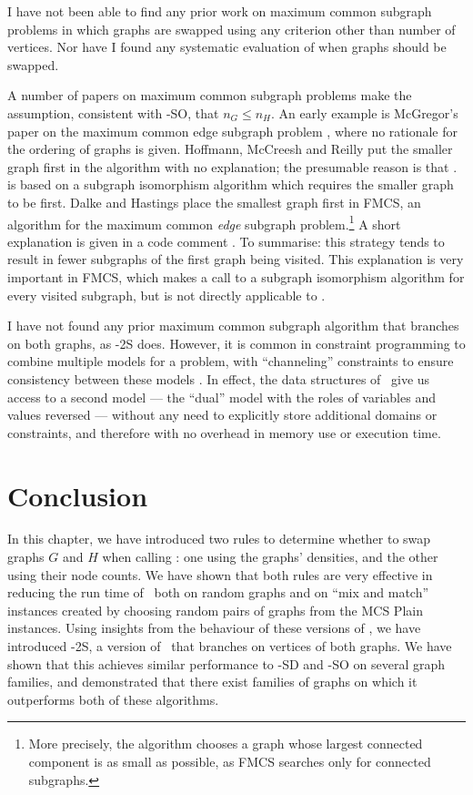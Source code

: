 I have not been able to find any prior work on maximum common subgraph problems in which
graphs are swapped using any criterion other than number of vertices.  Nor have I found
any systematic evaluation of when graphs should be swapped.

A number of papers on maximum common subgraph problems make the assumption, consistent
with \McSplit-SO, that $n_G \leq n_H$.  An early example
is McGregor's paper on the maximum common edge subgraph problem \cite{DBLP:journals/spe/McGregor82},
where no rationale for the ordering of graphs is given.
Hoffmann, McCreesh and Reilly \cite{UpcomingAAAIPaper} put the smaller graph first
in the \kDown algorithm with no explanation; the presumable reason is that \kDown.
is based on a subgraph isomorphism algorithm which requires the smaller graph to be first.
Dalke and Hastings \cite{DBLP:journals/jcheminf/DalkeH13} place the smallest
graph first in FMCS, an algorithm for the maximum
common \emph{edge} subgraph problem.\footnote{More precisely, the algorithm chooses a graph whose largest
connected component is as small as possible, as FMCS searches only for connected subgraphs.}
A short explanation is given in a code comment \cite{DalkeFmcsSource}. To summarise: this strategy tends to
result in fewer subgraphs of the first graph being visited.  This explanation is very
important in FMCS, which makes a call to a subgraph isomorphism algorithm for every visited
subgraph, but is not directly applicable to \McSplit.

I have not found any prior maximum common subgraph algorithm that branches on both graphs,
as \McSplit-2S does.  However, it is common in constraint programming to combine multiple models
for a problem, with ``channeling'' constraints to ensure consistency between these models
\cite{DBLP:journals/constraints/ChengCLW99}.  In effect, the data structures of \McSplit\
give us access to a second model --- the ``dual'' model with the roles of variables and values
reversed \cite{DBLP:conf/ecai/Geelen92} --- without any need to explicitly store additional
domains or constraints, and therefore with no overhead in memory use
or execution time.

\section{Conclusion}\label{sec:swapping-conclusion}

In this chapter, we have introduced two rules to determine whether to swap graphs $G$ and $H$
when calling \McSplit: one using the graphs' densities, and the other using their node counts.
We have shown that both rules are very effective in reducing the run time of \McSplit\ both on random
graphs and on ``mix and match'' instances created by choosing random pairs of graphs from the
MCS Plain instances.  Using insights from the behaviour of these versions of \McSplit, we have
introduced \McSplit-2S, a version of \McSplit\ that branches on vertices of both graphs.  We have
shown that this achieves similar performance to \McSplit-SD and \McSplit-SO on several graph
families, and demonstrated that there exist families of graphs on which it outperforms both
of these algorithms.

